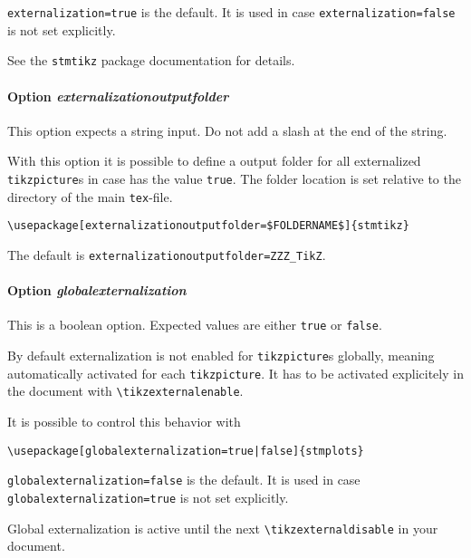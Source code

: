 \documentclass{scrartcl}
\begin{document}
\texttt{externalization=true} is the default. It is used in case \texttt{externalization=false} is not set explicitly.

See the \texttt{stmtikz} package documentation for details.

\paragraph{Option \protect\textit{externalizationoutputfolder}}
\label{sec:usage:preamble:wholepackage:options:outputfolder}

This option expects a string input. Do not add a slash at the end of the string.

With this option it is possible to define a output folder for all externalized \texttt{tikzpicture}s in case  has the value \texttt{true}. The folder location is set relative to the directory of the main \texttt{tex}-file.

\begin{verbatim}
\usepackage[externalizationoutputfolder=$FOLDERNAME$]{stmtikz}
\end{verbatim}

The default is \texttt{externalizationoutputfolder=ZZZ\_TikZ}.

\paragraph{Option \protect\textit{globalexternalization}}
\label{sec:usage:preamble:wholepackage:options:globalexternalization}

This is a boolean option.  Expected values are either \texttt{true} or \texttt{false}. 

By default externalization is not enabled for \texttt{tikzpicture}s globally, meaning automatically activated for each \texttt{tikzpicture}. It has to be activated explicitely in the document with \texttt{\textbackslash tikzexternalenable}.

It is possible to control this behavior with 

\begin{verbatim}
\usepackage[globalexternalization=true|false]{stmplots}
\end{verbatim}

\texttt{globalexternalization=false} is the default. It is used in case \texttt{globalexternalization=true} is not set explicitly.

Global externalization is active until the next \texttt{\textbackslash tikzexternaldisable} in your document.
\end{document}
